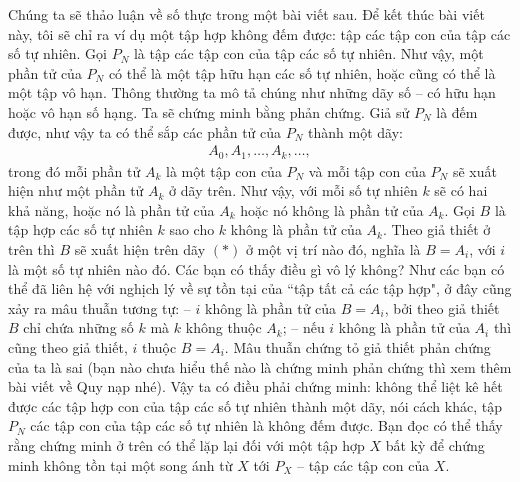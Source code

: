 	\begin{multicols}{2}
	Chúng ta sẽ thảo luận về số thực trong một bài viết sau. Để kết thúc bài viết này, tôi sẽ chỉ ra ví dụ một tập hợp không đếm được: tập các tập con của tập các số tự nhiên.
	\vskip 0.1cm
	Gọi $P_N$ là tập các tập con của tập các số tự nhiên. Như vậy, một phần tử của $P_N$ có thể là một tập hữu hạn các số tự nhiên, hoặc cũng có thể là một tập vô hạn. Thông thường ta mô tả chúng như những dãy số -- có hữu hạn hoặc vô hạn số hạng. 
	\vskip 0.1cm
	Ta sẽ chứng minh bằng phản chứng. Giả sử $P_N$ là đếm được, như vậy ta có thể sắp các phần tử của $P_N$ thành một dãy:
	\begin{align*}
		A_0, A_1, \ldots, A_k, \ldots,
	\end{align*}
	trong đó mỗi phần tử $A_k$ là một tập con của $P_N$ và mỗi tập con của $P_N$ sẽ xuất hiện như một phần tử $A_k$ ở dãy trên.
	\vskip 0.1cm
	Như vậy, với mỗi số tự nhiên $k$ sẽ có hai khả năng, hoặc nó là phần tử của $A_k$ hoặc nó không là phần tử của $A_k$. Gọi $B$ là tập hợp các số tự nhiên $k$ sao cho $k$ không là phần tử của $A_k$.
	\vskip 0.1cm
	Theo giả thiết ở trên thì $B$ sẽ xuất hiện trên dãy $(*)$ ở một vị trí nào đó, nghĩa là 
	$B=A_i$, với $i$ là một số tự nhiên nào đó.
	\vskip 0.1cm
	Các bạn có thấy điều gì vô lý không?
	Như các bạn có thể đã liên hệ với nghịch lý về sự tồn tại của ``tập tất cả các tập hợp", ở đây cũng xảy ra mâu thuẫn tương tự:
	\vskip 0.1cm
	-- $i$ không là phần tử của $B=A_i$, bởi theo giả thiết $B$ chỉ chứa những số $k$ mà $k$ không thuộc $A_k$;
	\vskip 0.1cm
	-- nếu $i$ không là phần tử của $A_i$ thì cũng theo giả thiết, $i$ thuộc $B=A_i$.
	\vskip 0.1cm
	Mâu thuẫn chứng tỏ giả thiết phản chứng của ta là sai (bạn nào chưa hiểu thế nào là chứng minh phản chứng thì xem thêm bài viết về Quy nạp nhé). Vậy ta có điều phải chứng minh: không thể liệt kê hết được các tập hợp con của tập các số tự nhiên thành một dãy, nói cách khác, tập $P_N$ các tập con của tập các số tự nhiên là không đếm được.
	\vskip 0.1cm
	Bạn đọc có thể thấy rằng chứng minh ở trên có thể lặp lại đối với một tập hợp $X$ bất kỳ để chứng minh không tồn tại một song ánh từ $X$ tới $P_X$ -- tập các tập con của $X$.
\end{multicols}

